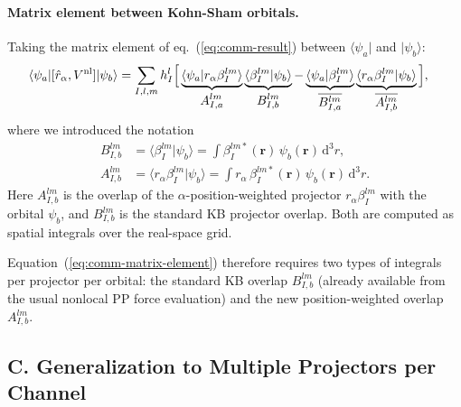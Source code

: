 \paragraph{Matrix element between Kohn-Sham orbitals.}
Taking the matrix element of eq.~(\ref{eq:comm-result}) between
$\langle\psi_a|$ and $|\psi_b\rangle$:
\begin{align}
  \langle\psi_a|[\hat{r}_\alpha,V^{\mathrm{nl}}]|\psi_b\rangle
  &= \sum_{I,l,m} h^l_I
     \Big[
       \underbrace{\langle\psi_a|r_\alpha\beta^{lm}_I\rangle}_{
         \displaystyle A^{lm}_{I,a}}
       \underbrace{\langle\beta^{lm}_I|\psi_b\rangle}_{
         \displaystyle B^{lm}_{I,b}}
     - \underbrace{\langle\psi_a|\beta^{lm}_I\rangle}_{
         \displaystyle \overline{B^{lm}_{I,a}}}
       \underbrace{\langle r_\alpha\beta^{lm}_I|\psi_b\rangle}_{
         \displaystyle \overline{A^{lm}_{I,b}}}
     \Big],
  \label{eq:comm-matrix-element}
\end{align}
where we introduced the notation
\begin{align}
  B^{lm}_{I,b}
  &= \langle\beta^{lm}_I|\psi_b\rangle
   = \int \beta^{lm*}_I(\mathbf{r})\,\psi_b(\mathbf{r})
     \,\mathrm{d}^3r,
  \label{eq:B-overlap}
  \\
  A^{lm}_{I,b}
  &= \langle r_\alpha\beta^{lm}_I|\psi_b\rangle
   = \int r_\alpha\,\beta^{lm*}_I(\mathbf{r})\,\psi_b(\mathbf{r})
     \,\mathrm{d}^3r.
  \label{eq:A-overlap}
\end{align}
Here $A^{lm}_{I,b}$ is the overlap of the $\alpha$-position-weighted
projector $r_\alpha\beta^{lm}_I$ with the orbital $\psi_b$, and
$B^{lm}_{I,b}$ is the standard KB projector overlap.
Both are computed as spatial integrals over the real-space grid.

Equation~(\ref{eq:comm-matrix-element}) therefore requires two types
of integrals per projector per orbital: the standard KB overlap
$B^{lm}_{I,b}$ (already available from the usual nonlocal PP force
evaluation) and the new position-weighted overlap $A^{lm}_{I,b}$.

\subsection*{C.\; Generalization to Multiple Projectors per Channel}
\label{app:multi-projector}

